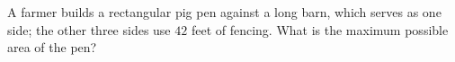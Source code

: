 A farmer builds a rectangular pig pen against a long barn, which serves as one side; the other three sides use $42$ feet of fencing. What is the maximum possible area of the pen?
